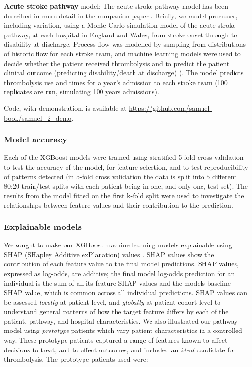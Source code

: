 \textbf{Acute stroke pathway} model: The acute stroke pathway model has been described in more detail in the companion paper \cite{pearn_identifying_2024}. Briefly, we model processes, including variation, using a Monte Carlo simulation model of the acute stroke pathway, at each hospital in England and Wales, from stroke onset through to disability at discharge. Process flow was modelled by sampling from distributions of historic flow for each stroke team, and machine learning models were used to decide whether the patient received thrombolysis \cite{pearn_what_2023} and to predict the patient clinical outcome (predicting disability/death at discharge) \cite{pearn_are_2024}). The model predicts thrombolysis use and times for a year’s admission to each stroke team (100 replicates are run, simulating 100 years admissions).

Code, with demonstration, is available at \url{https://github.com/samuel-book/samuel_2_demo}.

\subsubsection{Model accuracy}

Each of the XGBoost models were trained using stratified 5-fold cross-validation to test the accuracy of the model, for feature selection, and to test reproducibility of patterns detected (in 5-fold cross validation the data is split into 5 different 80:20 train/test splits with each patient being in one, and only one, test set). The results from the model fitted on the first k-fold split were used to investigate the relationships between feature values and their contribution to the prediction.

\subsubsection{Explainable models}

We sought to make our XGBoost machine learning models explainable using SHAP (SHapley Additive exPlanation) values \cite{lundberg_unified_2017}. SHAP values show the contribution of each feature value to the final model predictions. SHAP values, expressed as log-odds, are additive; the final model log-odds prediction for an individual is the sum of all its feature SHAP values and the models baseline SHAP value, which is common across all individual predictions. SHAP values can be assessed \textit{locally} at patient level, and \textit{globally} at patient cohort level to understand general patterns of how the target feature differs by each of the patient, pathway, and hospital characteristics. We also illustrated our pathway model using \textit{prototype} patients which vary patient characteristics in a controlled way. These prototype patients captured a range of features known to affect decisions to treat, and to affect outcomes, and included an \textit{ideal} candidate for thrombolysis. The prototype patients used were:

